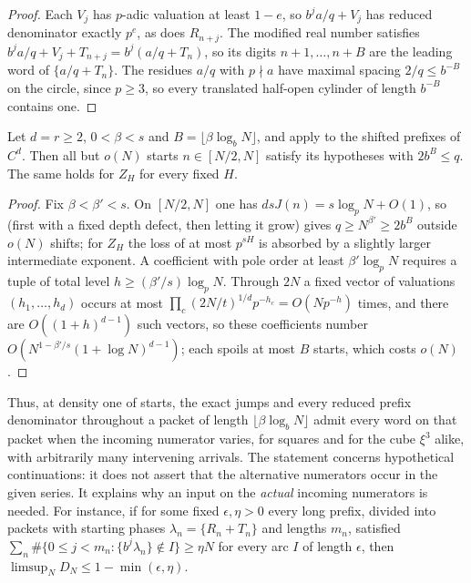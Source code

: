 \documentclass[11pt]{article}
\newcommand{\fr}[1]{\{#1\}}
\begin{document}
\begin{proof}
Each $V_j$ has $p$-adic valuation at least $1-e$, so $b^ja/q+V_j$ has reduced denominator exactly $p^e$, as does
$R_{n+j}$. The modified real number satisfies $b^ja/q+V_j+T_{n+j}=b^j(a/q+T_n)$, so its digits $n+1,\ldots,n+B$ are the
leading word of $\fr{a/q+T_n}$. The residues $a/q$ with $p\nmid a$ have maximal spacing $2/q\le b^{-B}$ on the circle,
since $p\ge3$, so every translated half-open cylinder of length $b^{-B}$ contains one.
\end{proof}

\begin{proposition}\label{prop:packets}
Let $d=r\ge2$, $0<\beta<s$ and $B=\lfloor\beta\log_bN\rfloor$, and apply  to the shifted prefixes of $C^d$.
Then all but $o(N)$ starts $n\in[N/2,N]$ satisfy its hypotheses with $2b^B\le q$. The same holds for $Z_H$ for every
fixed $H$.
\end{proposition}

\begin{proof}
Fix $\beta<\beta'<s$. On $[N/2,N]$ one has $dsJ(n)=s\log_pN+O(1)$, so  (first with a fixed depth
defect, then letting it grow) gives $q\ge N^{\beta'}\ge2b^B$ outside $o(N)$ shifts; for $Z_H$ the loss of at most
$p^{sH}$ is absorbed by a slightly larger intermediate exponent. A coefficient with pole order at least
$\beta'\log_pN$ requires a tuple of total level $h\ge(\beta'/s)\log_pN$. Through $2N$ a fixed vector of valuations
$(h_1,\ldots,h_d)$ occurs at most $\prod_c(2N/t)^{1/d}p^{-h_c}=O(Np^{-h})$ times, and there are $O((1+h)^{d-1})$ such
vectors, so these coefficients number $O(N^{1-\beta'/s}(1+\log N)^{d-1})$; each spoils at most $B$ starts, which costs
$o(N)$.
\end{proof}

Thus, at density one of starts, the exact jumps and every reduced prefix denominator throughout a packet of
length $\lfloor\beta\log_bN\rfloor$ admit every word on that packet when the incoming numerator varies, for squares and
for the cube $\xi^3$ alike, with arbitrarily many intervening arrivals. The statement concerns hypothetical
continuations: it does not assert that the alternative numerators occur in the given series. It explains why an
input on the \emph{actual} incoming numerators is needed. For instance, if for some fixed $\epsilon,\eta>0$ every
long prefix, divided into packets with starting phases $\lambda_n=\fr{R_n+T_n}$ and lengths $m_n$, satisfied
$\sum_n\#\{0\le j<m_n:\fr{b^j\lambda_n}\notin I\}\ge\eta N$ for every arc $I$ of length $\epsilon$, then
$\limsup_ND_N\le1-\min(\epsilon,\eta)$.
\end{document}
